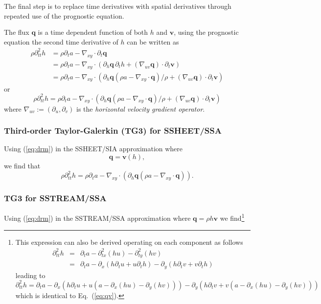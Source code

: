 \documentclass[10pt,a4paper]{book}
\newcommand{\p}{\partial}
\begin{document}
The final step is to replace time derivatives with spatial derivatives
through repeated use of the prognostic equation.


The flux $\bm{q}$ is a time dependent function of both
$h$ and $\bm{v}$, using the prognostic equation the second time
derivative of $h$ can be written as
\begin{align*}
\rho \p^2_{tt} h &= \rho \p_t a-  \nabla_{xy} \cdot \p_t \bm{q} \\
            &= \rho \p_t a-  \nabla_{xy} \cdot ( \p_h \bm{q}  \, \p_t h + (\nabla_{uv} \bm{q})\cdot  \p_t \bm{v}) \\
            &= \rho \p_t a-  \nabla_{xy} \cdot ( \p_h \bm{q}  (\rho a-\nabla_{xy} \cdot \bm{q})/\rho+ (\nabla_{uv} \bm{q})\cdot  \p_t \bm{v}) 
\end{align*}
or
\begin{equation}
\rho \p^2_{tt} h = \rho \p_t a-  \nabla_{xy} \cdot ( \p_h \bm{q}  (\rho a-\nabla_{xy} \cdot \bm{q})/\rho+ (\nabla_{uv} \bm{q})\cdot  \p_t \bm{v})
\label{eq:drm}
\end{equation}
where $\nabla_{uv}:=(\p_u , \p_v)$ is the {\em horizontal velocity gradient operator}.


\subsubsection{Third-order Taylor-Galerkin (TG3) for SSHEET/SSA}

Using (\ref{eq:drm}) in the  SSHEET/SIA approximation where
\[
\bm{q}=\bm{v}(h) ,
\]
we find that
\[
\rho \p^2_{tt} h=\rho \p_t a - \nabla_{xy} \cdot ( \p_h \bm{q} (\rho a -\nabla_{xy} \cdot \bm{q})).
\]


\subsubsection{TG3 for SSTREAM/SSA}
Using (\ref{eq:drm}) in the SSTREAM/SSA approximation where $\bm{q}=\rho h \bm{v}$ we
find\footnote{This expression can also be derived operating on each
  component as follows
\begin{eqnarray*}
\p^2_{tt} h &=& \p_t a -\p^2_{tx} ( h u) -\p^2_{ty} ( h v ) \nonumber \\
            &=& \p_t a -\p_x ( h \p_t u+ u \p_t h ) -\p_{y} ( h \p_t v + v \p_t h ) \nonumber 
\end{eqnarray*}
leading to
\begin{equation}
            \p^2_{tt} h= \p_t a -\p_x ( h \p_t u+ u (a- \p_x(h u) - \p_y (h v)) ) -\p_{y} ( h \p_t v + v (a- \p_x(h u) - \p_y (h v)) ) 
\label{eq:tw}
\end{equation}
which is identical to Eq.~(\ref{eq:qv}).}  
\end{document}

